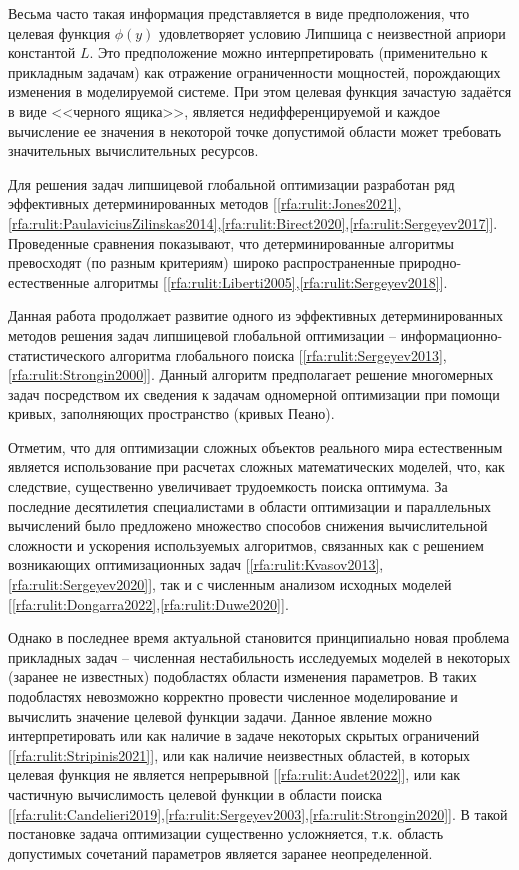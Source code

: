 \documentclass[a4paper,12pt,russian]{article}
\begin{document}
Весьма часто такая информация представляется в виде предположения, что целевая функция $\phi(y)$ удовлетворяет условию Липшица с неизвестной априори константой $L$. Это предположение можно интерпретировать (применительно к прикладным задачам) как отражение ограниченности мощностей, порождающих изменения в моделируемой системе. При этом целевая функция зачастую задаётся в виде <<черного ящика>>, является недифференцируемой и каждое вычисление ее значения в некоторой точке допустимой области может требовать значительных вычислительных ресурсов.

Для решения задач липшицевой глобальной оптимизации разработан ряд эффективных детерминированных методов 
[\ref{rfa:rulit:Jones2021},\ref{rfa:rulit:PaulaviciusZilinskas2014},\ref{rfa:rulit:Birect2020},\ref{rfa:rulit:Sergeyev2017}]. Проведенные сравнения показывают, что детерминированные алгоритмы превосходят (по разным критериям) широко распространенные природно-естественные алгоритмы [\ref{rfa:rulit:Liberti2005},\ref{rfa:rulit:Sergeyev2018}].

Данная работа продолжает развитие одного из эффективных детерминированных методов решения задач липшицевой глобальной оптимизации -- ин\-фор\-ма\-ци\-он\-но-ста\-тис\-ти\-чес\-ко\-го алгоритма глобального поиска [\ref{rfa:rulit:Sergeyev2013},\ref{rfa:rulit:Strongin2000}]. Данный алгоритм предполагает решение многомерных задач посредством их сведения к задачам одномерной оптимизации при помощи кривых, заполняющих пространство (кривых Пеано). 

Отметим, что для оптимизации сложных объектов реального мира естественным является использование при расчетах сложных математических моделей, что, как следствие, существенно увеличивает трудоемкость поиска оптимума. За последние десятилетия специалистами в области оптимизации и параллельных вычислений было предложено множество способов снижения вычислительной сложности и ускорения используемых алгоритмов, связанных как с решением возникающих оптимизационных задач [\ref{rfa:rulit:Kvasov2013},\ref{rfa:rulit:Sergeyev2020}], так и с численным анализом исходных моделей [\ref{rfa:rulit:Dongarra2022},\ref{rfa:rulit:Duwe2020}].

Однако в последнее время актуальной становится принципиально новая проблема прикладных задач -- численная нестабильность исследуемых моделей в некоторых (заранее не известных) подобластях области изменения параметров. В таких подобластях невозможно корректно провести численное моделирование и вычислить значение целевой функции задачи. Данное явление можно интерпретировать или как наличие в задаче некоторых скрытых ограничений [\ref{rfa:rulit:Stripinis2021}], или как наличие неизвестных областей, в которых целевая функция не является непрерывной [\ref{rfa:rulit:Audet2022}], или как частичную вычислимость целевой функции в области поиска [\ref{rfa:rulit:Candelieri2019},\ref{rfa:rulit:Sergeyev2003},\ref{rfa:rulit:Strongin2020}]. В такой постановке задача оптимизации существенно усложняется, т.к. область допустимых сочетаний параметров является заранее неопределенной.
\end{document}
